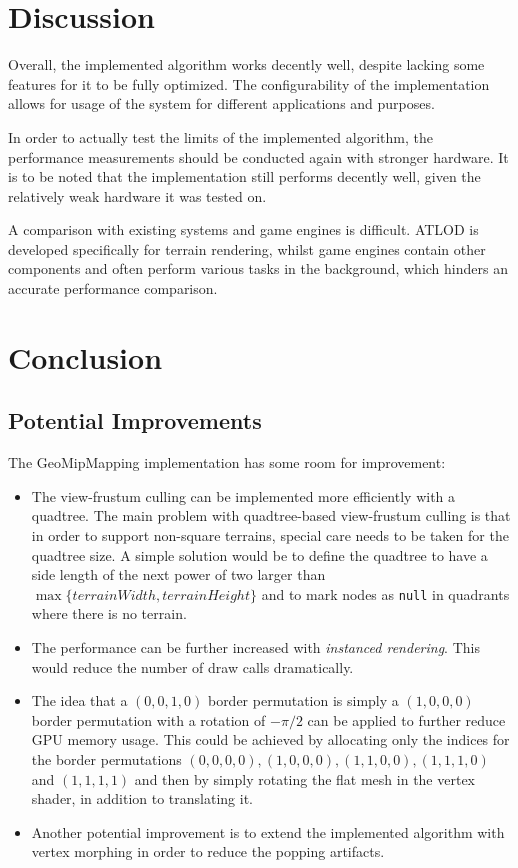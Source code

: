 \chapter{Discussion}
Overall, the implemented algorithm works decently well, despite 
lacking some features for it to be fully optimized.
The configurability of the implementation allows for usage of the 
system for different applications and purposes.

In order to actually test the limits of the implemented algorithm, the performance measurements
should be conducted again with stronger hardware.
It is to be noted that the implementation still performs decently 
well, given the relatively weak hardware it was tested on.

A comparison with existing systems and game engines is difficult. ATLOD is 
developed specifically for terrain rendering, whilst game engines
contain other components and often perform various tasks in the background, 
which hinders an accurate performance comparison.

\chapter{Conclusion}
\section{Potential Improvements}
The GeoMipMapping implementation has some room for improvement:
\begin{itemize}
      \item The view-frustum culling can be implemented more efficiently with a quadtree. The main problem with quadtree-based view-frustum culling 
            is that in order to support non-square terrains, special care needs to be taken for the quadtree size.
            A simple solution would be to define the quadtree to have a side length of the next power of two 
            larger than $\max \{terrainWidth, terrainHeight\}$ and to mark nodes as \texttt{null} in quadrants where there is no terrain.
      \item The performance can be further increased with \textit{instanced rendering}. This would reduce the number of draw calls dramatically.
      \item The idea that a $(0,0,1,0)$ border permutation is simply a $(1,0,0,0)$ border permutation with a rotation of $-\pi/2$ can be applied
     to further reduce GPU memory usage. This could be achieved by allocating only the indices for the border permutations $(0,0,0,0),(1,0,0,0),(1,1,0,0),(1,1,1,0)$ and $(1,1,1,1)$
            and then by simply rotating the flat mesh in the vertex shader, in addition to translating it.
      \item Another potential improvement is to extend the implemented algorithm with vertex morphing in order to reduce the popping artifacts.
\end{itemize}

